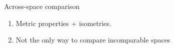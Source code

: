 \documentclass{beamer}
\begin{document}
\begin{frame}{Across-space comparison}

\vspace{-0.3cm}
\begin{minipage}[t]{0.5\linewidth}
\begin{enumerate}
  \item Metric properties + isometries.
  \item Not the only way to compare incomparable spaces


\end{enumerate}
\end{minipage}
\end{frame}
\end{document}
